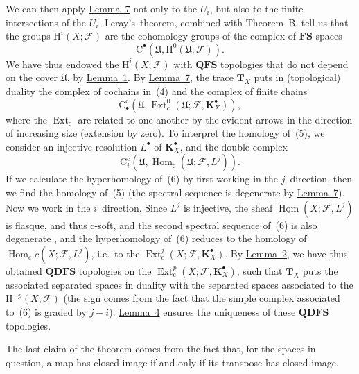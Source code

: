 \documentclass[british]{article}
\begin{document}
We can then apply \hyperref[lemma-7]{Lemma~7} not only to the \(U_i\),
but also to the finite intersections of the \(U_i\). Leray's~theorem,
combined with Theorem~B, tell us that the groups
\(\mathrm{H}^i(X;{\mathscr{F}})\) are the cohomology groups of the
complex of \(\mathbf{FS}\)-spaces \[
  \mathrm{C}^\bullet({\mathfrak{U}},\mathrm{H}^0({\mathfrak{U}};{\mathscr{F}})).
\tag{4}
\] We have thus endowed the \(\mathrm{H}^i(X;{\mathscr{F}})\) with
\(\mathbf{QFS}\) topologies that do not depend on the cover
\({\mathfrak{U}}\), by \hyperref[lemma-1]{Lemma~1}. By
\hyperref[lemma-7]{Lemma~7}, the trace \(\mathbf{T}_X\) puts in
(topological) duality the complex of cochains in~(4) and the complex of
finite chains \[
  \mathrm{C}_\bullet^\mathrm{c}({\mathfrak{U}},\operatorname{Ext}_\mathrm{c}^0({\mathfrak{U}};{\mathscr{F}},\mathbf{K}_X^\bullet)),
\tag{5}
\] where the \(\operatorname{Ext}_\mathrm{c}\) are related to one
another by the evident arrows in the direction of increasing size
(extension by zero). To interpret the homology of~(5), we consider an
injective resolution \(L^\bullet\) of \(\mathbf{K}_X^\bullet\), and the
double complex \[
  \mathrm{C}_i^\mathrm{c}({\mathfrak{U}},\operatorname{Hom}_\mathrm{c}({\mathfrak{U}};{\mathscr{F}},L^j)).
\tag{6}
\] If we calculate the hyperhomology of~(6) by first working in the
\(j\)~direction, then we find the homology of~(5) (the spectral sequence
is degenerate by \hyperref[lemma-7]{Lemma~7}). Now we work in the
\(i\)~direction. Since \(L^j\) is injective, the sheaf
\(\underline{\operatorname{Hom}}(X;{\mathscr{F}},L^j)\) is flasque, and
thus \(\mathrm{c}\)-soft, and the second spectral sequence of~(6) is
also degenerate \autocite{3}, and the hyperhomology of~(6) reduces to
the homology of \(\operatorname{Hom}_cc(X;{\mathscr{F}},L^j)\), i.e.~to
the
\(\operatorname{Ext}_\mathrm{c}^j(X;{\mathscr{F}},\mathbf{K}_X^\bullet)\).
By \hyperref[lemma-2]{Lemma~2}, we have thus obtained \(\mathbf{QDFS}\)
topologies on the
\(\operatorname{Ext}_\mathrm{c}^p(X;{\mathscr{F}},\mathbf{K}_X^\bullet)\),
such that \(\mathbf{T}_X\) puts the associated separated spaces in
duality with the separated spaces associated to the
\(\mathrm{H}^{-p}(X;{\mathscr{F}})\) (the sign comes from the fact that
the simple complex associated to~(6) is graded by \(j-i\)).
\hyperref[lemma-4]{Lemma~4} ensures the uniqueness of these
\(\mathbf{QDFS}\) topologies.

The last claim of the theorem comes from the fact that, for the spaces
in question, a map has closed image if and only if its transpose has
closed image.
\end{document}
